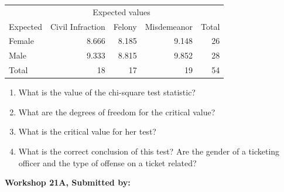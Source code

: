 \documentclass[11pt, chapterprefix=true]{scrbook}\usepackage[]{graphicx}\usepackage[]{color}
\begin{document}
\begin{exercises}
\begin{exercise}
\begin{center}
\begin{tabular}{@{} lrrrr @{}} \hline
 & \multicolumn{3}{c}{Expected values} \\
Expected&	Civil Infraction&	Felony&	Misdemeanor&	Total \\ \hline
Female&	8.666&	8.185&	9.148&	26 \\ \hline
Male&	9.333&	8.815&	9.852&	28 \\ \hline
Total&	18&	17&	19&	54 \\ \hline
\end{tabular}
\end{center}

\begin{enumerate}
  \item What is the value of the chi-square test statistic?
  \item	What are the degrees of freedom for the critical value?
  \item	What is the critical value for her test?
  \item	What is the correct conclusion of this test? Are the gender of a ticketing officer and the type of offense on a ticket related?
\end{enumerate}

\end{exercise}
\begin{solution}  %

\end{solution}


\clearpage

    \begin{exercise}  %

    \begin{center}
\begin{flushleft}\textbf{\large \hfill Workshop 21A, Submitted by: }\end{flushleft}

\end{center}
\end{exercise}
\end{exercises}
\end{document}
